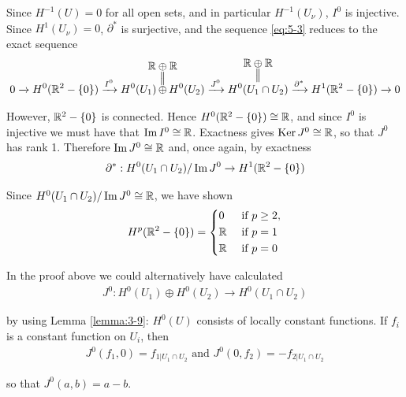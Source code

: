 Since $H^{-1}(U) = 0$ for all open sets, and in particular $H^{-1}(U_\nu)$, $I^0$ is
injective. Since $H^1(U_\nu) = 0$, $\partial^*$ is surjective, and the sequence \eqref{eq:5-3} reduces to
the exact sequence
\begin{align*}
  0\xra[] H^0(\RR^2-\{0\})\xra[I^0] H^0(U_1)
  \hspace*{-1em}\overset{\substack{\displaystyle\RR\oplus\RR\\\big|\!\big|}}{\oplus}\hspace*{-1em} 
  H^0(U_2)\xra[J^0] 
  \overset{\substack{\displaystyle\RR\oplus\RR\\\big|\!\big|}}{H^0(U_1\cap U_2)}
  \xra[\partial^*]H^1(\RR^2-\{0\})\xra[] 0
\end{align*}

However, ${\mathbb{R}}^2-\{0\}$ is connected. Hence $H^0({\mathbb{R}}^2-\{0\}) \cong {\ensuremath{\mathbb{R}}}$, and since $I^0$ is 
injective we must have that $\operatorname{Im} I^0\cong{\ensuremath{\mathbb{R}}}$. Exactness gives $\operatorname{Ker} J^0\cong{\ensuremath{\mathbb{R}}}$, so that $J^0$
has rank 1. Therefore $\operatorname{Im} J^0\cong {\ensuremath{\mathbb{R}}}$ and, once again, by exactness
\begin{align*}
  \partial^*: H^0(U_1\cap U_2)/\operatorname{Im} J^0 \to H^1({\mathbb{R}}^2-\{0\})
\end{align*}

Since $H^0(U_1\cap U_2)/\operatorname{Im} J^0\cong {\ensuremath{\mathbb{R}}}$, we have shown
\begin{align*}
  H^p({\mathbb{R}}^2 - \{0\}) = \left\{\begin{aligned}
    & 0 && \text{ if } p\ge 2,\\
    & {\mathbb{R}} && \text{ if } p = 1 \\
    & {\mathbb{R}} && \text{ if } p = 0
  \end{aligned}\right.
\end{align*}


In the proof above we could alternatively have calculated
\begin{align*}
  J^0:H^0(U_1)\oplus H^0(U_2)\to H^0(U_1\cap U_2)
\end{align*}

by using Lemma \ref{lemma:3-9}: $H^0(U)$ consists of locally constant functions. If $f_i$ is a
constant function on $U_i$, then
\begin{align*}
  J^0(f_1,0) = f_{1|U_1\cap U_2} \text{ and } J^0(0,f_2) = -f_{2|U_1\cap U_2}
\end{align*}

so that $J^0(a, b) = a - b$.

